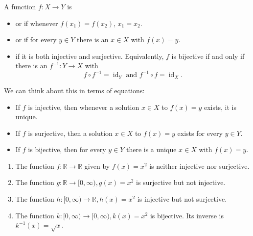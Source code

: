 \documentclass[titlepage=false]{sl2art}
\newcommand{\RR}{\mathbb{R}}
\newcommand{\id}{\operatorname{id}}
\begin{document}
\begin{definition}
  A function \(f : X \to Y\) is
  \begin{itemize}
    \item {} or   if whenever \(f(x_1) = f(x_2)\), \(x_1 = x_2\).
    \item  {} or  if for every \(y \in Y\) there is an \(x \in X\) with \(f(x) = y\).
    \item {} if it is both injective and surjective.
      Equivalently, \(f\) is bijective if and only if there is an  \(f^{-1} : Y \to X\) with
      \[
        f\circ f^{-1} = \id_Y \text{ and } f^{-1} \circ f = \id_X.
      \]
  \end{itemize}
\end{definition}
We can think about this in terms of equations:
\begin{itemize}
  \item If \(f\) is injective, then whenever a solution \(x\in X\) to \(f(x) = y\) exists, it is unique.
  \item If \(f\) is surjective, then a solution \(x\in X\) to \(f(x) = y\) exists for every \(y \in Y\).
  \item If \(f\) is bijective, then for every \(y \in Y\) there is a unique \(x \in X\) with \(f(x) = y\).
\end{itemize}
\begin{example}
  \begin{enumerate}
    \item The function \(f : \RR \to \RR\) given by \(f(x) = x^2\) is neither injective nor surjective.
    \item The function \(g : \RR \to [0, \infty), g(x) = x^2\)  is surjective but not injective.
    \item The function \(h : [0,\infty) \to \RR, h(x) = x^2\) is injective but  not surjective.
    \item The function \(k : [0,\infty) \to [0,\infty), k(x) = x^2\) is bijective.
      Its inverse is \(k^{-1}(x) = \sqrt{x}\).\qedhere
  \end{enumerate}
\end{example}
\end{document}

